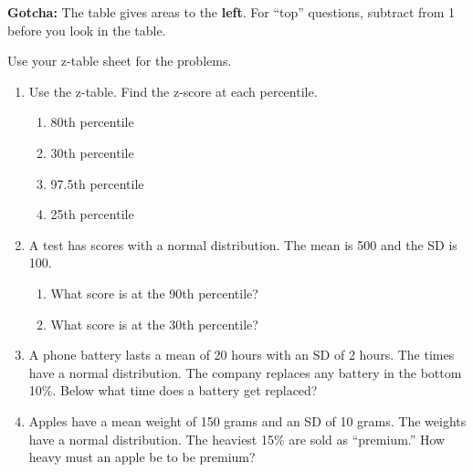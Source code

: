 \documentclass[11pt]{article}
\begin{document}
\vspace{0.8em}
\textbf{Gotcha:} The table gives areas to the \textbf{left}. For ``top'' questions, subtract from 1 before you look in the table.

\vspace{0.4em}
Use your z-table sheet for the problems.

\partner

\newpage
\begin{enumerate}

\item Use the z-table. Find the z-score at each percentile.
\begin{enumerate}[itemsep=1.4em]
  \item 80th percentile 
  \item 30th percentile 
  \item 97.5th percentile 
  \item 25th percentile 
\end{enumerate}
\work{1em}

\item A test has scores with a normal distribution. The mean is 500 and the SD is 100.
\begin{enumerate}[itemsep=1em]
  \item What score is at the 90th percentile?

  \work{3.5em}
  \item What score is at the 30th percentile?

\end{enumerate}
\work{3.5em}

\item A phone battery lasts a mean of 20 hours with an SD of 2 hours. The times have a normal distribution. The company replaces any battery in the bottom 10\%. Below what time does a battery get replaced?

\work{5em}

\item Apples have a mean weight of 150 grams and an SD of 10 grams. The weights have a normal distribution. The heaviest 15\% are sold as ``premium.'' How heavy must an apple be to be premium?


\end{enumerate}
\end{document}
